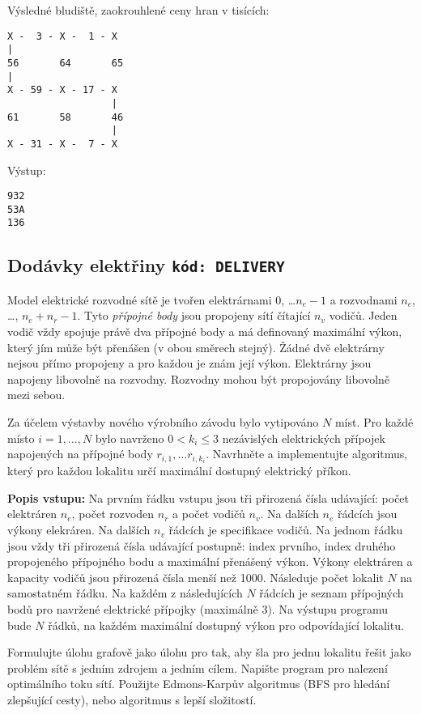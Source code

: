 \documentclass[a4paper,10pt]{article}
\begin{document}
Výsledné bludiště, zaokrouhlené ceny hran v tisících:
\begin{verbatim}
X -  3 - X -  1 - X
|                  
56       64       65
|         
X - 59 - X - 17 - X
                  |
61       58       46
                  |
X - 31 - X -  7 - X
\end{verbatim}

Výstup:
\begin{verbatim}
932
53A
136
\end{verbatim}


\subsection{Dodávky elektřiny \hfill{\tt kód: DELIVERY}}
Model elektrické rozvodné sítě je tvořen elektrárnami $0$, \dots $n_e-1$  a rozvodnami $n_e$, \dots, $n_e + n_r-1$. Tyto \emph{přípojné body} jsou propojeny sítí čítající  $n_v$ vodičů. Jeden vodič vždy spojuje právě dva 
přípojné body a má definovaný maximální výkon, který jím může být přenášen (v obou směrech stejný). 
Žádné dvě elektrárny nejsou přímo propojeny a pro každou je znám její výkon. 
Elektrárny jsou napojeny libovolně na rozvodny. Rozvodny mohou být propojovány libovolně mezi sebou. 

Za účelem výstavby nového výrobního závodu bylo vytipováno $N$ míst. Pro každé místo $i=1,\dots ,N$ bylo navrženo $0 < k_i \le 3$ nezávislých elektrických přípojek napojených na přípojné body $r_{i,1}, \dots r_{i,k_i}$.
Navrhněte a implementujte algoritmus, který pro každou lokalitu určí maximální dostupný elektrický příkon.

{\bf Popis vstupu: }
Na prvním řádku vstupu jsou tři přirozená čísla udávající: počet elektráren $n_e$, počet rozvoden $n_r$  a počet vodičů $n_v$. Na dalších $n_e$ řádcích jsou výkony elekráren. Na dalších $n_v$ řádcích je specifikace vodičů. Na jednom řádku jsou vždy tři přirozená čísla udávající postupně: index prvního, index druhého propojeného přípojného bodu a maximální přenášený výkon.
Výkony elektráren a kapacity vodičů jsou přirozená čísla menší než 1000.
Následuje počet lokalit $N$ na samostatném řádku. Na každém z následujících $N$ řádcích 
je seznam přípojných bodů pro navržené elektrické přípojky (maximálně 3).
Na výstupu programu bude $N$ řádků, na každém maximální dostupný výkon pro odpovídající lokalitu.

Formulujte úlohu grafově jako úlohu pro tak, aby šla pro jednu lokalitu řešit jako problém sítě s jedním zdrojem a jedním cílem. Napište program pro nalezení optimálního toku sítí. Použijte Edmons-Karpův algoritmus (BFS pro hledání zlepšující cesty), nebo algoritmus s lepší složitostí.
\end{document}
